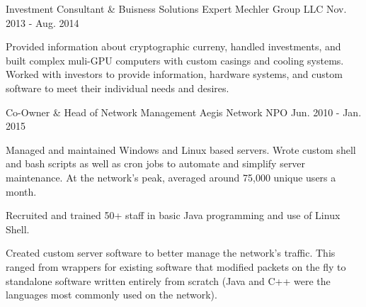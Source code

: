 \begin{cventries}
    \cventry
      {Investment Consultant \& Buisness Solutions Expert} %
      {Mechler Group LLC} %
      {} %
      {Nov. 2013 - Aug. 2014} %
      {
        \begin{cvitems} %
          \item {Provided information about cryptographic curreny, handled %
          investments, and built complex muli-GPU computers with custom casings %
          and cooling systems. Worked with investors to provide information, %
          hardware systems, and custom software to meet their individual needs %
          and desires.}
        \end{cvitems}
      }

  \cventry
    {Co-Owner \& Head of Network Management} %
    {Aegis Network NPO} %
    {} %
    {Jun. 2010 - Jan. 2015} %
    {
      \begin{cvitems} %
        \item {Managed and maintained Windows and Linux based servers. Wrote custom shell and bash scripts as well as cron jobs to automate and simplify server maintenance. At the network's peak, averaged around 75,000 unique users a month.}
        \item {Recruited and trained 50+ staff in basic Java programming and use of Linux Shell.}
        \item {Created custom server software to better manage the network's traffic. This ranged from wrappers for existing software that modified packets on the fly to standalone software written entirely from scratch (Java and C++ were the languages most commonly used on the network).}
      \end{cvitems}
    }

\end{cventries}
